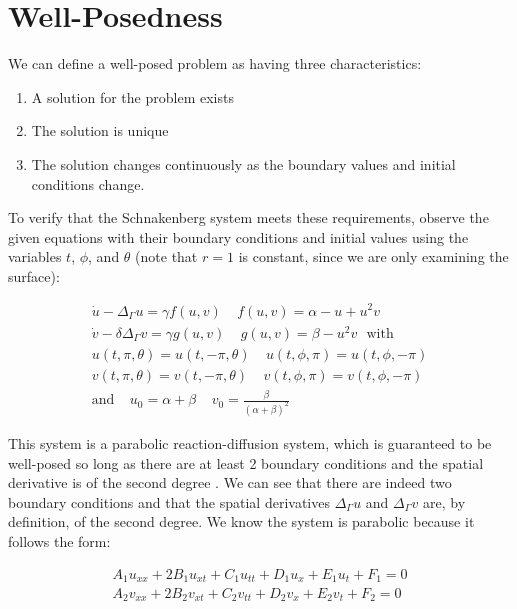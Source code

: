 \documentclass[12pt]{article}
\begin{document}
\section{Well-Posedness}

We can define a well-posed problem as having three characteristics:

\begin{enumerate}
	\item A solution for the problem exists
	\item The solution is unique
	\item The solution changes continuously as the boundary values and initial conditions change.
\end{enumerate}

To verify that the Schnakenberg system meets these requirements, observe the given equations with their boundary conditions and initial values using the variables $t$, $\phi$, and $\theta$ (note that $r=1$ is constant, since we are only examining the surface):

\begin{equation}
	\begin{aligned}
		\dot{u} - \Delta_\Gamma u = \gamma f(u,v) ~~~~~ f(u,v) = \alpha - u + u^2v ~~~\\
		\dot{v} - \delta\Delta_\Gamma v = \gamma g(u, v) ~~~~~ g(u, v) = \beta - u^2v ~~~ \text{with}\\
		u(t,\pi, \theta) = u(t, -\pi, \theta) ~~~~~ u(t, \phi, \pi) = u(t, \phi, -\pi) \\
		v(t,\pi, \theta) = v(t, -\pi, \theta) ~~~~~ v(t, \phi, \pi) = v(t, \phi, -\pi)	\\
		\text{and} ~~~~~ u_0 = \alpha + \beta ~~~~~ v_0 = \frac{\beta}{(\alpha+\beta)^2}~~~~~~
	\end{aligned}
\end{equation}

This system is a parabolic reaction-diffusion system, which is guaranteed to be well-posed so long as there are at least 2 boundary conditions and the spatial derivative is of the second degree \cite{Tuncer2015}. We can see that there are indeed two boundary conditions and that the spatial derivatives $\Delta_\Gamma u$ and $\Delta_\Gamma v$ are, by definition, of the second degree. We know the system is parabolic because it follows the form:

\begin{equation}
	\begin{aligned}
		A_1u_{xx} + 2B_1u_{xt} + C_1u_{tt} + D_1u_x + E_1u_t + F_1 = 0 \\
		A_2v_{xx} + 2B_2v_{xt} + C_2v_{tt} + D_2v_x + E_2v_t + F_2 = 0
	\end{aligned}
\end{equation}
\end{document}
